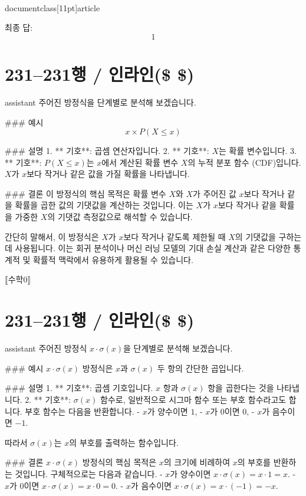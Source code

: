 \\documentclass[11pt]{article}
\begin{document}
최종 답:
\[ \boxed{1} \]

\section*{231–231행 / 인라인(\$ \$) }
assistant
주어진 방정식을 단계별로 분석해 보겠습니다.

### 예시
\[ x \times P(X \le x) \]

### 설명
1. ** 기호**: 곱셈 연산자입니다.
2. ** 기호**: \( X \)는 확률 변수입니다.
3. ** 기호**: \( P(X \le x) \)는 \( x \)에서 계산된 확률 변수 \( X \)의 누적 분포 함수 (CDF)입니다. \( X \)가 \( x \)보다 작거나 같은 값을 가질 확률을 나타냅니다.

### 결론
이 방정식의 핵심 목적은 확률 변수 \( X \)와 \( X \)가 주어진 값 \( x \)보다 작거나 같을 확률을 곱한 값의 기댓값을 계산하는 것입니다. 이는 \( X \)가 \( x \)보다 작거나 같을 확률을 가중한 \( X \)의 기댓값 측정값으로 해석할 수 있습니다.

간단히 말해서, 이 방정식은 \( X \)가 \( x \)보다 작거나 같도록 제한될 때 \( X \)의 기댓값을 구하는 데 사용됩니다. 이는 회귀 분석이나 머신 러닝 모델의 기대 손실 계산과 같은 다양한 통계적 및 확률적 맥락에서 유용하게 활용될 수 있습니다.

⟦수학0⟧

\section*{231–231행 / 인라인(\$ \$) }
assistant
주어진 방정식 \( x \cdot \sigma(x) \)을 단계별로 분석해 보겠습니다.

### 예시
\( x \cdot \sigma(x) \) 방정식은 \( x \)과 \( \sigma(x) \) 두 항의 간단한 곱입니다.

### 설명
1. ** 기호**: 곱셈 기호입니다. \( x \) 항과 \( \sigma(x) \) 항을 곱한다는 것을 나타냅니다.
2. ** 기호**: \( \sigma(x) \) 함수로, 일반적으로 시그마 함수 또는 부호 함수라고도 합니다. 부호 함수는 다음을 반환합니다.
- \( x \)가 양수이면 \( 1 \),
- \( x \)가 0이면 \( 0 \),
- \( x \)가 음수이면 \( -1 \).

따라서 \( \sigma(x) \)는 \( x \)의 부호를 출력하는 함수입니다.

### 결론
\( x \cdot \sigma(x) \) 방정식의 핵심 목적은 \( x \)의 크기에 비례하여 \( x \)의 부호를 반환하는 것입니다. 구체적으로는 다음과 같습니다.
- \( x \)가 양수이면 \( x \cdot \sigma(x) = x \cdot 1 = x \).
- \( x \)가 0이면 \( x \cdot \sigma(x) = x \cdot 0 = 0 \).
- \( x \)가 음수이면 \( x \cdot \sigma(x) = x \cdot (-1) = -x \).
\end{document}
